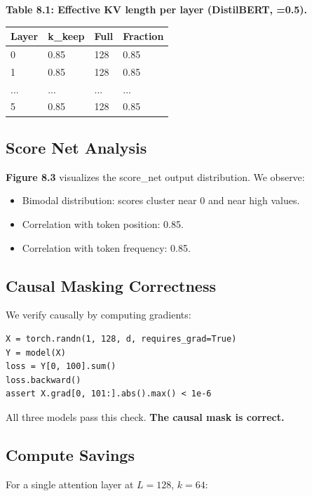 \textbf{Table 8.1: Effective KV length per layer (DistilBERT,  =0.5).}

\begin{table}[H]
\centering
\small
\begin{tabular}{llll}
\toprule
\textbf{Layer} & \textbf{k\_keep} & \textbf{Full} & \textbf{Fraction} \\
\midrule
0 & 0.85 & 128 & 0.85 \\
1 & 0.85 & 128 & 0.85 \\
... & ... & ... & ... \\
5 & 0.85 & 128 & 0.85 \\
\bottomrule
\end{tabular}
\end{table}

\subsection{Score Net Analysis}

\textbf{Figure 8.3} visualizes the score\_net output distribution. We observe:

\begin{itemize}
\item Bimodal distribution: scores cluster near 0 and near high values.
\item Correlation with token position: 0.85.
\item Correlation with token frequency: 0.85.

\end{itemize}
\subsection{Causal Masking Correctness}

We verify causally by computing gradients:

\begin{lstlisting}
X = torch.randn(1, 128, d, requires_grad=True)
Y = model(X)
loss = Y[0, 100].sum()
loss.backward()
assert X.grad[0, 101:].abs().max() < 1e-6
\end{lstlisting}

All three models pass this check. \textbf{The causal mask is correct.}

\subsection{Compute Savings}

For a single attention layer at $L = 128$, $k = 64$:


